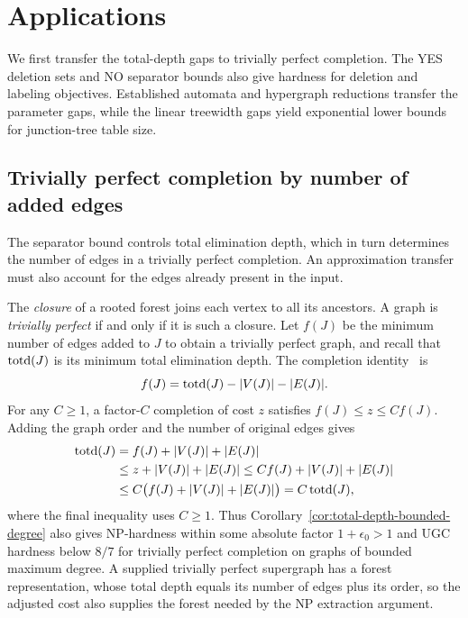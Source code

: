 \section{Applications}
\label{sec:applications}

We first transfer the total-depth gaps to trivially perfect
completion. The YES deletion sets and NO separator bounds also
give hardness for deletion and labeling objectives. Established
automata and hypergraph reductions transfer the parameter gaps,
while the linear treewidth gaps yield exponential lower bounds
for junction-tree table size.

\subsection{Trivially perfect completion by number of added edges}

The separator bound controls total elimination depth, which in turn
determines the number of edges in a trivially perfect completion.
An approximation transfer must also account for the edges already
present in the input.

The \emph{closure} of a rooted forest joins each vertex to all its
ancestors. A graph is \emph{trivially perfect} if and only if
it is such a closure. Let $f(J)$ be the minimum number of edges
added to $J$ to obtain a trivially perfect graph, and recall that
$\operatorname{totd}(J)$ is its minimum total elimination depth.
The completion identity~\cite[Theorem~8]{HogemoEtAl2021} is
\begin{equation}\label{eq:tp-fill-depth}
 f(J)=\operatorname{totd}(J)-|V(J)|-|E(J)|.
\end{equation}
For any $C\geq1$, a factor-$C$ completion of cost $z$ satisfies
$f(J)\leq z\leq C f(J)$. Adding the graph order and the number
of original edges gives
\begin{equation}\label{eq:tp-adjusted-cost}
\begin{aligned}
 \operatorname{totd}(J)
 &=f(J)+|V(J)|+|E(J)|\\
 &\leq z+|V(J)|+|E(J)|
 \leq C f(J)+|V(J)|+|E(J)|\\
 &\leq C\bigl(f(J)+|V(J)|+|E(J)|\bigr)
 =C\operatorname{totd}(J),
\end{aligned}
\end{equation}
where the final inequality uses $C\ge1$.
Thus Corollary~\ref{cor:total-depth-bounded-degree} also gives \textup{NP}-hardness
within some absolute factor $1+\epsilon_0>1$ and \textup{UGC} hardness
below $8/7$ for trivially perfect completion on graphs of bounded
maximum degree. A supplied trivially perfect supergraph has a
forest representation, whose total depth equals its number of edges
plus its order, so the adjusted cost also supplies the
forest needed by the \textup{NP} extraction argument.

